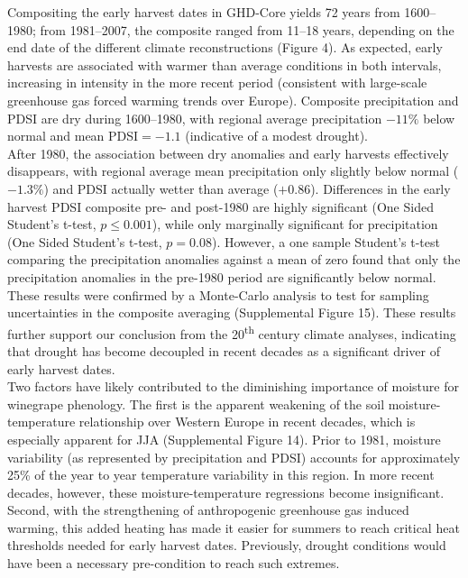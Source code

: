 \documentclass[final]{nature}
\begin{document}
\indent Compositing the early harvest dates in GHD-Core yields 72 years from 1600--1980; from 1981--2007, the composite ranged from 11--18 years, depending on the end date of the different climate reconstructions (Figure 4). As expected, early harvests are associated with warmer than average conditions in both intervals, increasing in intensity in the more recent period (consistent with large-scale greenhouse gas forced warming trends over Europe). Composite precipitation and PDSI are dry during 1600--1980, with regional average precipitation $-11\%$ below normal and mean PDSI$=-1.1$ (indicative of a modest drought).\\
\indent After 1980, the association between dry anomalies and early harvests effectively disappears, with regional average mean precipitation only slightly below normal ($-1.3\%$) and PDSI actually wetter than average ($+0.86$). Differences in the early harvest PDSI composite pre- and post-1980 are highly significant (One Sided Student's t-test, $p\le0.001$), while only marginally significant for precipitation (One Sided Student's t-test, $p=0.08$). However, a one sample Student's t-test comparing the precipitation anomalies against a mean of zero found that only the precipitation anomalies in the pre-1980 period are significantly below normal. These results were confirmed by a Monte-Carlo analysis to test for sampling uncertainties in the composite averaging (Supplemental Figure 15). These results further support our conclusion from the 20\textsuperscript{th} century climate analyses, indicating that drought has become decoupled in recent decades as a significant driver of early harvest dates.\\
\indent Two factors have likely contributed to the diminishing importance of moisture for winegrape phenology. The first is the apparent weakening of the soil moisture-temperature relationship over Western Europe in recent decades, which is especially apparent for JJA (Supplemental Figure 14). Prior to 1981, moisture variability (as represented by precipitation and PDSI) accounts for approximately 25\% of the year to year temperature variability in this region. In more recent decades, however, these moisture-temperature regressions become insignificant. Second, with the strengthening of anthropogenic greenhouse gas induced warming, this added heating has made it easier for summers to reach critical heat thresholds needed for early harvest dates. Previously, drought conditions would have been a necessary pre-condition to reach such extremes.\\
\end{document}
